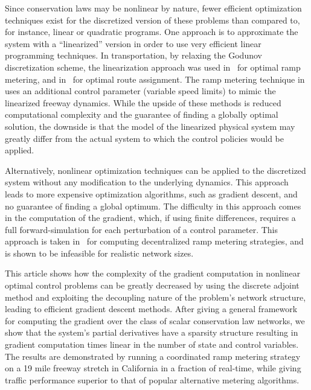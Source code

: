Since conservation laws may be nonlinear by nature, fewer efficient optimization techniques exist for the discretized version of these problems than compared to, for instance, linear or quadratic programs. One approach is to approximate the system with a ``linearized'' version in order to use very efficient linear programming techniques. In transportation, by relaxing the Godunov discretization scheme, the linearization approach was used in~\cite{gomes2006optimal} for optimal ramp metering, and in~\cite{ziliaskopoulos2000linear} for optimal route assignment. The ramp metering technique in~\cite{Muralidharana} uses an additional control parameter (variable speed limits) to mimic the linearized freeway dynamics. While the upside of these methods is reduced computational complexity and the guarantee of finding a globally optimal solution, the downside is that the model of the linearized physical system may greatly differ from the actual system to which the control policies would be applied.

Alternatively, nonlinear optimization techniques can be applied to the discretized system without any modification to the underlying dynamics. This approach leads to more expensive optimization algorithms, such as gradient descent, and no guarantee of finding a global optimum. The difficulty in this approach comes in the computation of the gradient, which, if using finite differences, requires a full forward-simulation for each perturbation of a control parameter. This approach is taken in~\cite{Ramon2013,Frejo2011} for computing decentralized ramp metering strategies, and is shown to be infeasible for realistic network sizes.

This article shows how the complexity of the gradient computation in nonlinear optimal control problems can be greatly decreased by using the discrete adjoint method and exploiting the decoupling nature of the problem's network structure, leading to efficient gradient descent methods. After giving a general framework for computing the gradient over the class of scalar conservation law networks, we show that the system's partial derivatives have a sparsity structure resulting in gradient computation times linear in the number of state and control variables. The results are demonstrated by running a coordinated ramp metering strategy on a 19 mile freeway stretch in California in a fraction of real-time, while giving traffic performance superior to that of popular alternative metering algorithms.

